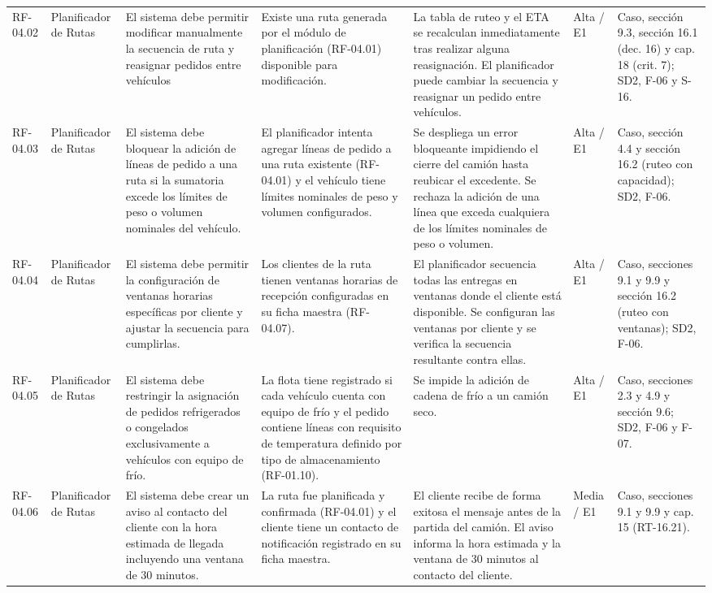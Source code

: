{\begin{longtable}{@{}F{0.062} F{0.080} F{0.195} F{0.160} F{0.240} F{0.093} F{0.170}@{}}
  RF-04.02 & Planificador de Rutas & El sistema debe permitir modificar manualmente la secuencia de ruta y reasignar pedidos entre vehículos & Existe una ruta generada por el módulo de planificación (RF-04.01) disponible para modificación. & La tabla de ruteo y el ETA se recalculan inmediatamente tras realizar alguna reasignación. El planificador puede cambiar la secuencia y reasignar un pedido entre vehículos. & Alta / E1 & Caso, sección 9.3, sección 16.1 (dec. 16) y cap. 18 (crit. 7); SD2, F-06 y S-16. \\
  RF-04.03 & Planificador de Rutas & El sistema debe bloquear la adición de líneas de pedido a una ruta si la sumatoria excede los límites de peso o volumen nominales del vehículo. & El planificador intenta agregar líneas de pedido a una ruta existente (RF-04.01) y el vehículo tiene límites nominales de peso y volumen configurados. & Se despliega un error bloqueante impidiendo el cierre del camión hasta reubicar el excedente. Se rechaza la adición de una línea que exceda cualquiera de los límites nominales de peso o volumen. & Alta / E1 & Caso, sección 4.4 y sección 16.2 (ruteo con capacidad); SD2, F-06. \\
  RF-04.04 & Planificador de Rutas & El sistema debe permitir la configuración de ventanas horarias específicas por cliente y ajustar la secuencia para cumplirlas. & Los clientes de la ruta tienen ventanas horarias de recepción configuradas en su ficha maestra (RF-04.07). & El planificador secuencia todas las entregas en ventanas donde el cliente está disponible. Se configuran las ventanas por cliente y se verifica la secuencia resultante contra ellas. & Alta / E1 & Caso, secciones 9.1 y 9.9 y sección 16.2 (ruteo con ventanas); SD2, F-06. \\
  RF-04.05 & Planificador de Rutas & El sistema debe restringir la asignación de pedidos refrigerados o congelados exclusivamente a vehículos con equipo de frío. & La flota tiene registrado si cada vehículo cuenta con equipo de frío y el pedido contiene líneas con requisito de temperatura definido por tipo de almacenamiento (RF-01.10). & Se impide la adición de cadena de frío a un camión seco. & Alta / E1 & Caso, secciones 2.3 y 4.9 y sección 9.6; SD2, F-06 y F-07. \\
  RF-04.06 & Planificador de Rutas & El sistema debe crear un aviso al contacto del cliente con la hora estimada de llegada incluyendo una ventana de 30 minutos. & La ruta fue planificada y confirmada (RF-04.01) y el cliente tiene un contacto de notificación registrado en su ficha maestra. & El cliente recibe de forma exitosa el mensaje antes de la partida del camión. El aviso informa la hora estimada y la ventana de 30 minutos al contacto del cliente. & Media / E1 & Caso, secciones 9.1 y 9.9 y cap. 15 (RT-16.21). \\

\end{longtable}}

